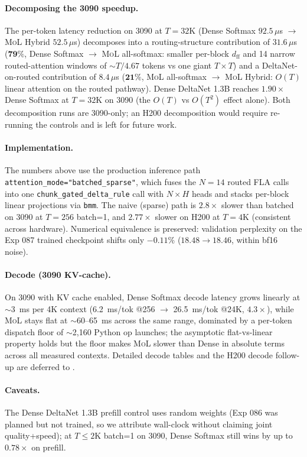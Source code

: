 \documentclass[10pt]{article}
\newcommand{\mol}{\textsc{MoL}}
\begin{document}
\paragraph{Decomposing the 3090 speedup.}
The per-token latency reduction on 3090 at $T{=}32$K (Dense Softmax $92.5\,\mu$s $\to$ \mol{} Hybrid $52.5\,\mu$s) decomposes into a routing-structure contribution of $31.6\,\mu$s ($\mathbf{79\%}$, Dense Softmax $\to$ \mol{} all-softmax: smaller per-block $d_\textrm{ff}$ and 14 narrow routed-attention windows of $\sim T/4.67$ tokens vs one giant $T{\times}T$) and a DeltaNet-on-routed contribution of $8.4\,\mu$s ($\mathbf{21\%}$, \mol{} all-softmax $\to$ \mol{} Hybrid: $O(T)$ linear attention on the routed pathway). Dense DeltaNet 1.3B reaches $1.90\times$ Dense Softmax at $T{=}32$K on 3090 (the $O(T)$ vs $O(T^2)$ effect alone). Both decomposition runs are 3090-only; an H200 decomposition would require re-running the controls and is left for future work.

\paragraph{Implementation.} The numbers above use the production inference path \texttt{attention\_mode="batched\_sparse"}, which fuses the $N{=}14$ routed FLA calls into one \texttt{chunk\_gated\_delta\_rule} call with $N{\times}H$ heads and stacks per-block linear projections via \texttt{bmm}. The naive (sparse) path is $2.8\times$ slower than batched on 3090 at $T{=}256$ batch=1, and $2.77\times$ slower on H200 at $T{=}4$K (consistent across hardware). Numerical equivalence is preserved: validation perplexity on the Exp 087 trained checkpoint shifts only $-0.11\%$ ($18.48 \to 18.46$, within bf16 noise).

\paragraph{Decode (3090 KV-cache).} On 3090 with KV cache enabled, Dense Softmax decode latency grows linearly at $\sim$3~ms per 4K context (6.2~ms/tok @256 $\to$ 26.5~ms/tok @24K, $4.3\times$), while \mol{} stays flat at $\sim$60--65~ms across the same range, dominated by a per-token dispatch floor of $\sim$2,160 Python op launches; the asymptotic flat-vs-linear property holds but the floor makes \mol{} slower than Dense in absolute terms across all measured contexts. Detailed decode tables and the H200 decode follow-up are deferred to .

\paragraph{Caveats.} The Dense DeltaNet 1.3B prefill control uses random weights (Exp 086 was planned but not trained, so we attribute wall-clock without claiming joint quality+speed); at $T\leq 2$K batch=1 on 3090, Dense Softmax still wins by up to $0.78\times$ on prefill.
\end{document}
